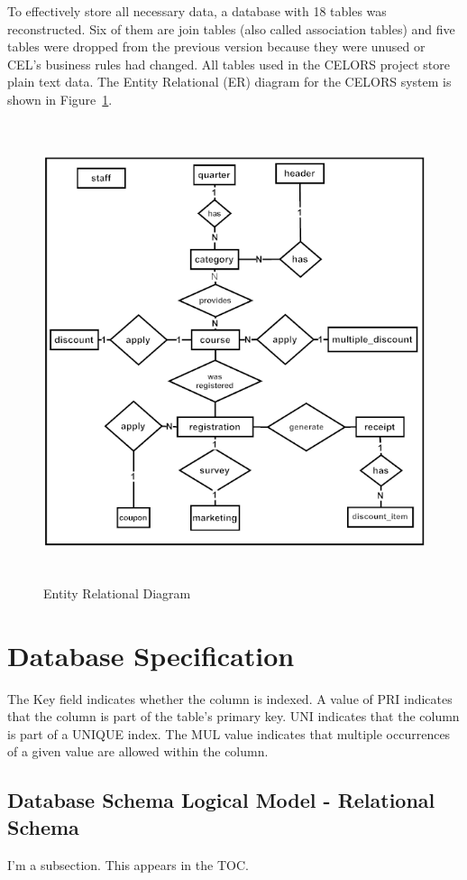 To effectively store all necessary data, a database with 18 tables was reconstructed. Six of them are join tables (also called association tables) and five tables were dropped from the previous version because they were unused or CEL's business rules had changed. All tables used in the CELORS project store plain text data. The Entity Relational (ER) diagram for the CELORS system is shown in Figure~\ref{fig:er_diagram}.

\vspace{3em}

\begin{figure}[H]
\begin{center}
    \includegraphics[height=5.3in]{images/ER_diagram.png}
    \caption{Entity Relational Diagram}
    \label{fig:er_diagram}
\end{center}
\end{figure}

\section{Database Specification}

The Key field indicates whether the column is indexed. A value of PRI indicates that the column is part of the table's primary key. UNI indicates that the column is part of a UNIQUE index. The MUL  value indicates that multiple occurrences of a given value are allowed within the column.

\subsection{Database Schema Logical Model - Relational Schema}

I'm a subsection.  This appears in the TOC.